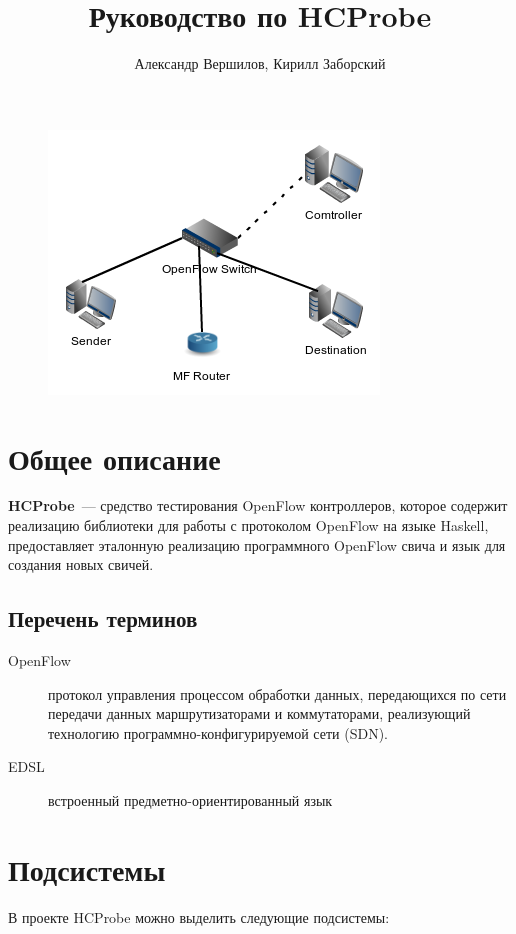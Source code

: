 \documentclass[9pt,a4paper]{article}
\title{Руководство по HCProbe}
\author{Александр Вершилов, Кирилл Заборский}
\begin{document}
\maketitle
\begin{figure}[!h]
   \centering 
   \includegraphics[width=0.3\columnwidth]{images/testcfg2.png}
\end{figure}                                                        

\tableofcontents

\pagebreak

\section{Общее описание}

\textbf{HCProbe}~--- средство тестирования OpenFlow контроллеров, которое
содержит реализацию библиотеки для работы с протоколом OpenFlow на языке
Haskell, предоставляет эталонную реализацию программного OpenFlow свича и язык
для создания новых свичей.

\subsection{Перечень терминов}

\begin{description}
  \item[OpenFlow] протокол управления процессом обработки данных, передающихся
    по сети передачи данных маршрутизаторами и коммутаторами, реализующий
    технологию программно-конфигурируемой сети (SDN).
  \item[EDSL] встроенный предметно-ориентированный язык
\end{description}

\pagebreak

\section{Подсистемы}

В проекте HCProbe можно выделить следующие подсистемы:
\end{document}
